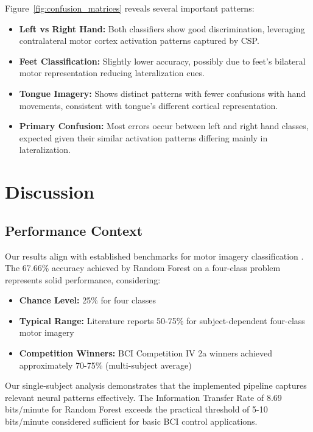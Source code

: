 \documentclass[11pt]{article}
\begin{document}
Figure~\ref{fig:confusion_matrices} reveals several important patterns:

\begin{itemize}
    \item \textbf{Left vs Right Hand:} Both classifiers show good discrimination, leveraging contralateral motor cortex activation patterns captured by CSP.
    \item \textbf{Feet Classification:} Slightly lower accuracy, possibly due to feet's bilateral motor representation reducing lateralization cues.
    \item \textbf{Tongue Imagery:} Shows distinct patterns with fewer confusions with hand movements, consistent with tongue's different cortical representation.
    \item \textbf{Primary Confusion:} Most errors occur between left and right hand classes, expected given their similar activation patterns differing mainly in lateralization.
\end{itemize}

\section{Discussion}

\subsection{Performance Context}

Our results align with established benchmarks for motor imagery classification \citep{tangermann2012review,lotte2018review,brunner2008bci}. The 67.66\% accuracy achieved by Random Forest on a four-class problem represents solid performance, considering:

\begin{itemize}
    \item \textbf{Chance Level:} 25\% for four classes
    \item \textbf{Typical Range:} Literature reports 50-75\% for subject-dependent four-class motor imagery \citep{lotte2018review}
    \item \textbf{Competition Winners:} BCI Competition IV 2a winners achieved approximately 70-75\% (multi-subject average) \citep{tangermann2012review}
\end{itemize}

Our single-subject analysis demonstrates that the implemented pipeline captures relevant neural patterns effectively. The Information Transfer Rate of 8.69 bits/minute for Random Forest exceeds the practical threshold of 5-10 bits/minute considered sufficient for basic BCI control applications.
\end{document}
